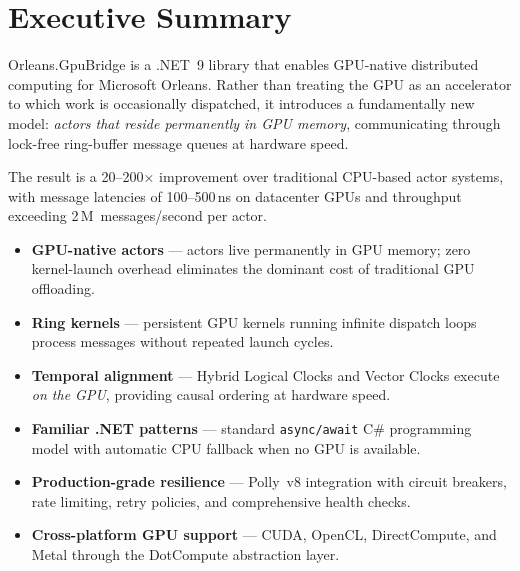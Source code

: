 \documentclass[11pt,a4paper]{article}
\begin{document}
\tableofcontents
\newpage

\section{Executive Summary}

Orleans.GpuBridge is a .NET~9 library that enables GPU-native distributed
computing for Microsoft Orleans. Rather than treating the GPU as an
accelerator to which work is occasionally dispatched, it introduces a
fundamentally new model: \emph{actors that reside permanently in GPU memory},
communicating through lock-free ring-buffer message queues at hardware speed.

The result is a 20--200$\times$ improvement over traditional CPU-based actor
systems, with message latencies of 100--500\,ns on datacenter GPUs and
throughput exceeding 2\,M~messages/second per actor.

\begin{tcolorbox}[keybox={Why Orleans.GpuBridge?}]
\begin{itemize}[leftmargin=1.2em, itemsep=3pt]
  \item \textbf{GPU-native actors} --- actors live permanently in GPU memory;
        zero kernel-launch overhead eliminates the dominant cost of
        traditional GPU offloading.
  \item \textbf{Ring kernels} --- persistent GPU kernels running infinite
        dispatch loops process messages without repeated launch cycles.
  \item \textbf{Temporal alignment} --- Hybrid Logical Clocks and Vector
        Clocks execute \emph{on the GPU}, providing causal ordering at
        hardware speed.
  \item \textbf{Familiar .NET patterns} --- standard \texttt{async/await}
        C\# programming model with automatic CPU fallback when no GPU is
        available.
  \item \textbf{Production-grade resilience} --- Polly~v8 integration with
        circuit breakers, rate limiting, retry policies, and comprehensive
        health checks.
  \item \textbf{Cross-platform GPU support} --- CUDA, OpenCL, DirectCompute,
        and Metal through the DotCompute abstraction layer.
\end{itemize}
\end{tcolorbox}
\end{document}
